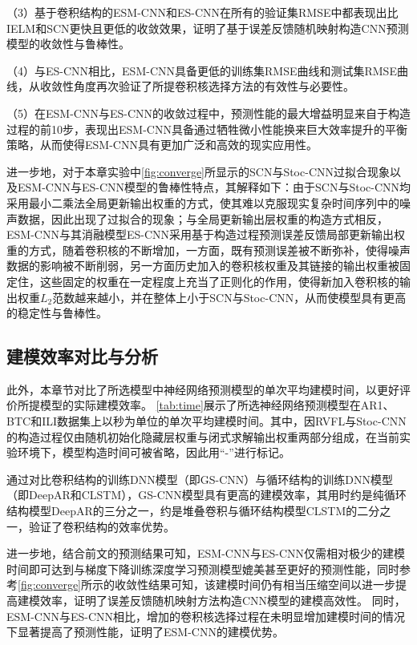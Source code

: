 （3）基于卷积结构的ESM-CNN和ES-CNN在所有的验证集RMSE中都表现出比IELM和SCN更快且更低的收敛效果，证明了基于误差反馈随机映射构造CNN预测模型的收敛性与鲁棒性。

（4）与ES-CNN相比，ESM-CNN具备更低的训练集RMSE曲线和测试集RMSE曲线，从收敛性角度再次验证了所提卷积核选择方法的有效性与必要性。

（5）在ESM-CNN与ES-CNN的收敛过程中，预测性能的最大增益明显来自于构造过程的前10步，表现出ESM-CNN具备通过牺牲微小性能换来巨大效率提升的平衡策略，从而使得ESM-CNN具有更加广泛和高效的现实应用性。


进一步地，对于本章实验中\autoref{fig:converge}所显示的SCN与Stoc-CNN过拟合现象以及ESM-CNN与ES-CNN模型的鲁棒性特点，其解释如下：由于SCN与Stoc-CNN均采用最小二乘法全局更新输出权重的方式，使其难以克服现实复杂时间序列中的噪声数据，因此出现了过拟合的现象；与全局更新输出层权重的构造方式相反，ESM-CNN与其消融模型ES-CNN采用基于构造过程预测误差反馈局部更新输出权重的方式，随着卷积核的不断增加，一方面，既有预测误差被不断弥补，使得噪声数据的影响被不断削弱，另一方面历史加入的卷积核权重及其链接的输出权重被固定住，这些固定的权重在一定程度上充当了正则化的作用，使得新加入卷积核的输出权重$L_2$范数越来越小，并在整体上小于SCN与Stoc-CNN，从而使模型具有更高的稳定性与鲁棒性。


\subsection{建模效率对比与分析}

此外，本章节对比了所选模型中神经网络预测模型的单次平均建模时间，以更好评价所提模型的实际建模效率。
\autoref{tab:time}展示了所选神经网络预测模型在AR1、BTC和ILI数据集上以秒为单位的单次平均建模时间。其中，因RVFL与Stoc-CNN的构造过程仅由随机初始化隐藏层权重与闭式求解输出权重两部分组成，在当前实验环境下，模型构造时间可被省略，因此用“-”进行标记。

通过对比卷积结构的训练DNN模型（即GS-CNN）与循环结构的训练DNN模型（即DeepAR和CLSTM），GS-CNN模型具有更高的建模效率，其用时约是纯循环结构模型DeepAR的三分之一，约是堆叠卷积与循环结构模型CLSTM的二分之一，验证了卷积结构的效率优势。

进一步地，结合前文的预测结果可知，ESM-CNN与ES-CNN仅需相对极少的建模时间即可达到与梯度下降训练深度学习预测模型媲美甚至更好的预测性能，同时参考\autoref{fig:converge}所示的收敛性结果可知，该建模时间仍有相当压缩空间以进一步提高建模效率，证明了误差反馈随机映射方法构造CNN模型的建模高效性。
同时，ESM-CNN与ES-CNN相比，增加的卷积核选择过程在未明显增加建模时间的情况下显著提高了预测性能，证明了ESM-CNN的建模优势。

